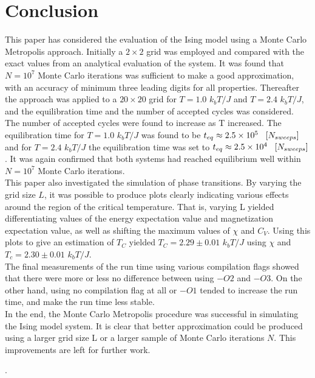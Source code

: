\documentclass[%
reprint,nofootinbib,
amsmath,amssymb,
aps,
]{revtex4-1}
\begin{document}
\section{Conclusion} \noindent 
This paper has considered the evaluation of the Ising model using a Monte Carlo Metropolis approach. Initially a $2\times 2$ grid was employed and compared with the exact values from an analytical evaluation of the system. It was found that $N = 10^7$ Monte Carlo iterations was sufficient to make a good approximation, with an accuracy of minimum three leading digits for all properties. Thereafter the approach was applied to a $20 \times 20$ grid for $T = 1.0$ $k_bT/J$ and $T = 2.4$ $k_bT/J$, and the equilibration time and the number of accepted cycles was considered. The number of accepted cycles were found to increase as T increased. The equilibration time for $T = 1.0$ $k_bT/J$  was found to be $
t_{eq} \approx 2.5\times10^5 \hspace{3mm}[N_{sweeps}]$ and for $T = 2.4$ $k_bT/J$ the equilibration time was set to $t_{eq} \approx 2.5\times10^4 \hspace{3mm}[N_{sweeps}]$. It was again confirmed that both systems had reached equilibrium well within $N = 10^7$ Monte Carlo iterations. \\ \indent 
This paper also investigated the simulation of phase transitions. By varying the grid size $L$, it was possible to produce plots clearly indicating various effects around the region of the critical temperature. That is, varying L yielded differentiating values of the energy expectation value and magnetization expectation value, as well as shifting the maximum values of $\chi$ and $C_V$.  Using this plots to give an estimation of $T_C$ yielded $T_C = 2.29 \pm 0.01$ $k_bT/J$ using $\chi$ and $T_c = 2.30 \pm 0.01$ $k_bT/J$.   \\ \indent 
The final measurements of the run time using various compilation flags showed that there were more or less no difference between using $-O2$ and $-O3$. On the other hand, using no compilation flag at all or $-O1$ tended to increase the run time, and make the run time less stable. \\ \indent 
In the end, the Monte Carlo Metropolis procedure was successful in simulating the Ising model system. It is clear that better approximation could be produced using a larger grid size L or a larger sample of Monte Carlo iterations $N$. This improvements are left for further work. 

\newpage . \newpage
\end{document}
